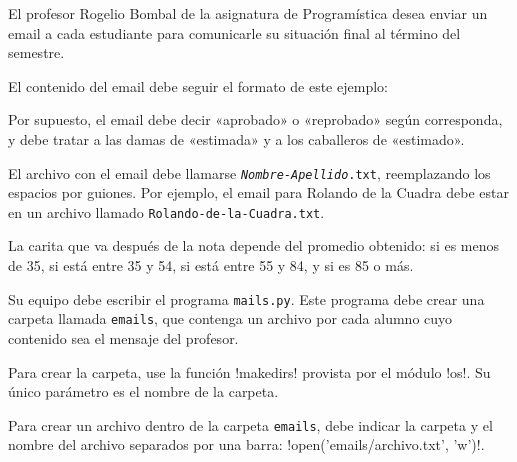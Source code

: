 \begin{certamen}[leftmargin=0pt]
  \newpage
  \item
    El profesor Rogelio Bombal de la asignatura de Programística
    desea enviar
    un email a cada estudiante para comunicarle su situación final
    al término del semestre.

    El contenido del email debe seguir el formato de este ejemplo:
    

    Por supuesto,
    el email debe decir «aprobado» o «reprobado» según corresponda,
    y debe tratar a las damas de «estimada»
    y a los caballeros de «estimado».

    \newpage

    El archivo con el email debe llamarse
    \texttt{\textit{Nombre}-\textit{Apellido}.txt},
    reemplazando los espacios por guiones.
    Por ejemplo,
    el email para Rolando de la Cuadra
    debe estar en un archivo llamado \texttt{Rolando-de-la-Cuadra.txt}.

    La carita que va después de la nota
    depende del promedio obtenido:
     si es menos de 35,
    \framebox{\texttt{:(}}  si está entre 35 y 54,
    \framebox{\texttt{:)}}  si está entre 55 y 84, y
      si es 85 o más.

    Su equipo debe escribir el programa \verb!mails.py!.
    Este programa debe
    crear una carpeta llamada \verb!emails!,
    que contenga un archivo por cada alumno
    cuyo contenido sea el mensaje del profesor.

    Para crear la carpeta,
    use la función \li!makedirs!
    provista por el módulo \li!os!.
    Su único parámetro es el nombre de la carpeta.

    Para crear un archivo dentro de la carpeta \verb!emails!,
    debe indi\-car la carpeta y el nombre del archivo
    separados por una barra: \li!open('emails/archivo.txt', 'w')!.


\end{certamen}
